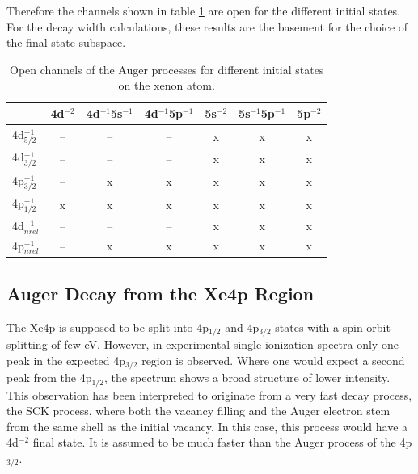 Therefore the channels shown in table \ref{table:Xe_open_channels} are
open for the different initial states. For the decay width calculations, these
results are the basement for the choice of the final state subspace.
\begin{table}[h]
  \centering
  \caption{Open channels of the Auger processes for different initial states
           on the xenon atom.}
  \begin{tabular}{lcccccc}
   \toprule
                   & 4d$^{-2}$ & 4d$^{-1}$5s$^{-1}$ & 4d$^{-1}$5p$^{-1}$ & 5s$^{-2}$ & 5s$^{-1}$5p$^{-1}$ & 5p$^{-2}$ \\
   \midrule
   4d$_{5/2}^{-1}$ &      --   &       --           &        --          &     x     &     x              &     x     \\
   4d$_{3/2}^{-1}$ &      --   &       --           &        --          &     x     &     x              &     x     \\
   4p$_{3/2}^{-1}$ &      --   &        x           &         x          &     x     &     x              &     x     \\
   4p$_{1/2}^{-1}$ &       x   &        x           &         x          &     x     &     x              &     x     \\
   \midrule
   4d$^{-1}_{nrel}$&      --   &       --           &        --          &     x     &     x              &     x     \\
   4p$^{-1}_{nrel}$&      --   &        x           &         x          &     x     &     x              &     x     \\
   \bottomrule
  \end{tabular}
  \label{table:Xe_open_channels}
\end{table}



\subsection{Auger Decay from the Xe4p Region}
The Xe4p is supposed to be split into 4p$_{1/2}$ and 4p$_{3/2}$ states with
a spin-orbit splitting of few \unit{eV}. However, in experimental single
ionization spectra only one peak in the expected 4p$_{3/2}$ region is observed.
Where one would expect a second peak from the 4p$_{1/2}$, the spectrum shows
a broad structure of lower intensity. This observation has been interpreted
to originate from a very fast decay process, the \ac{SCK} process, where both the
vacancy filling and the Auger electron stem from the same shell as the initial
vacancy. In this case, this process would have a 4d$^{-2}$ final state.
It is assumed to be much faster than the Auger process
of the 4p$_{3/2}$. 

